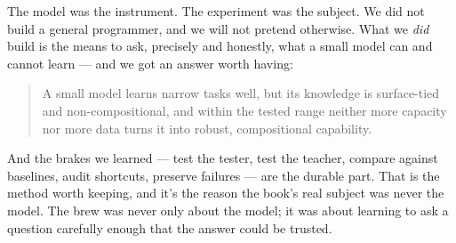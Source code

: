 The model was the instrument. The experiment was the subject. We did not
build a general programmer, and we will not pretend otherwise. What we
\emph{did} build is the means to ask, precisely and honestly, what a
small model can and cannot learn --- and we got an answer worth having:

\begin{quote}
A small model learns narrow tasks well, but its knowledge is
surface-tied and non-compositional, and within the tested range neither
more capacity nor more data turns it into robust, compositional
capability.
\end{quote}

And the brakes we learned --- test the tester, test the teacher, compare
against baselines, audit shortcuts, preserve failures --- are the
durable part. That is the method worth keeping, and it's the reason the
book's real subject was never the model. The brew was never only about
the model; it was about learning to ask a question carefully enough that
the answer could be trusted.
